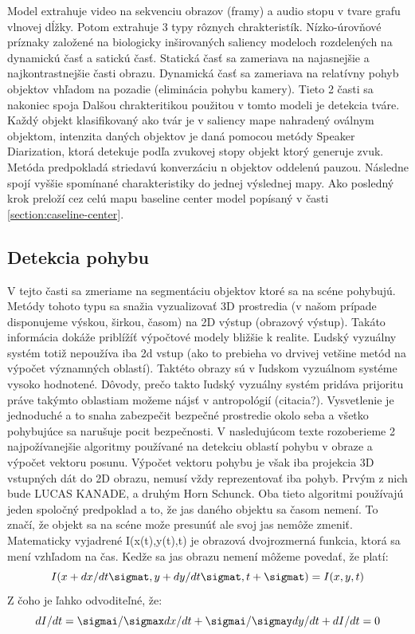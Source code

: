 Model extrahuje video na sekvenciu obrazov (framy) a audio stopu v tvare grafu vlnovej dĺžky. Potom extrahuje 3 typy rôznych chrakteristík. Nízko-úrovňové príznaky založené na biologicky inširovaných saliency modeloch rozdelených na dynamickú časť a satickú časť. Statická časť sa zameriava na najasnejšie a najkontrastnejšie časti obrazu. Dynamická časť sa zameriava na relatívny pohyb objektov vhľadom na pozadie (eliminácia pohybu kamery). Tieto 2 časti sa nakoniec spoja
Dalšou chrakteritikou použitou v tomto modeli je detekcia tváre. Každý objekt klasifikovaný ako tvár je v saliency mape nahradený oválnym objektom, intenzita daných objektov je daná pomocou metódy Speaker Diarization, ktorá detekuje podľa zvukovej stopy objekt ktorý generuje zvuk. Metóda predpokladá striedavú konverzáciu n objektov oddelenú pauzou. Následne spojí vyššie spomínané charakteristiky do jednej výslednej mapy. Ako posledný krok preloží cez celú mapu baseline center model popísaný v časti \ref{section:caseline-center}.

\subsection{Detekcia pohybu}
V tejto časti sa zmeriame na segmentáciu objektov ktoré sa na scéne pohybujú. Metódy tohoto typu sa snažia vyzualizovať 3D prostredia (v našom prípade disponujeme výskou, širkou, časom) na 2D výstup (obrazový výstup). Takáto informácia dokáže priblížíť výpočtové modely bližšie k realite. Ľudský vyzuálny systém totiž nepoužíva iba 2d vstup (ako to prebieha vo drvivej vetšine metód na výpočet významných oblastí). Taktéto obrazy sú v ľudskom vyzuálnom systéme vysoko hodnotené. Dôvody, prečo takto ľudský vyzuálny systém pridáva prijoritu práve takýmto oblastiam možeme nájsť v antropológií (citacia?). Vysvetlenie je jednoduché a to snaha zabezpečit bezpečné prostredie okolo seba a všetko pohybujúce sa narušuje pocit bezpečnosti. V nasledujúcom texte rozoberieme 2 najpožívanejšie algoritmy používané na detekciu oblastí pohybu v obraze a výpočet vektoru posunu. Výpočet vektoru pohybu je však iba projekcia 3D vstupných dát do 2D obrazu, nemusí vždy reprezentovať iba pohyb. Prvým z nich bude LUCAS KANADE\cite{lucas-kanade}, a druhým Horn Schunck\cite{horn-schunck}. Oba tieto algoritmi používajú jeden spoločný predpoklad a to, že jas daného objektu sa časom nemení. To značí, že objekt sa na scéne može presunúť  ale svoj jas nemôže zmeniť. Matematicky vyjadrené I(x(t),y(t),t) je obrazová dvojrozmerná funkcia, ktorá sa mení vzhľadom na čas. Kedže sa jas obrazu nemení môžeme povedať, že platí:
\begin{equation}
  I(x + dx/dt \sigmat ,y + dy/dt \sigmat, t + \sigmat) = I(x,y,t)
\end{equation}
Z čoho je ľahko odvoditeľné, že:
\begin{equation}
  dI/dt = \sigmai/\sigmax dx/dt + \sigmai/\sigmay dy/dt + dI/dt  =  0
\end{equation}


